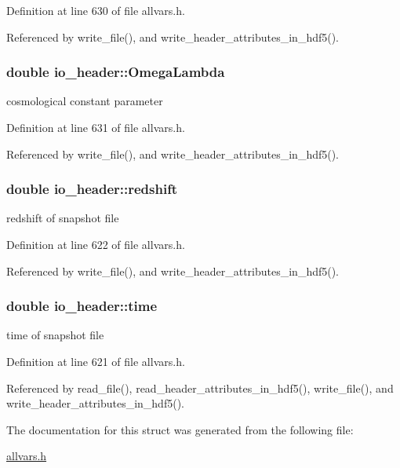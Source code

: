 Definition at line 630 of file allvars.h.



Referenced by write\_\-file(), and write\_\-header\_\-attributes\_\-in\_\-hdf5().

\hypertarget{structio__header_aa2cdc9653addc264b58134006bca1bb8}{
\subsubsection[{OmegaLambda}]{\setlength{\rightskip}{0pt plus 5cm}double {\bf io\_\-header::OmegaLambda}}}
\label{structio__header_aa2cdc9653addc264b58134006bca1bb8}
cosmological constant parameter 

Definition at line 631 of file allvars.h.



Referenced by write\_\-file(), and write\_\-header\_\-attributes\_\-in\_\-hdf5().

\hypertarget{structio__header_ae2484703f374288fb266ff268a1ffa91}{
\subsubsection[{redshift}]{\setlength{\rightskip}{0pt plus 5cm}double {\bf io\_\-header::redshift}}}
\label{structio__header_ae2484703f374288fb266ff268a1ffa91}
redshift of snapshot file 

Definition at line 622 of file allvars.h.



Referenced by write\_\-file(), and write\_\-header\_\-attributes\_\-in\_\-hdf5().

\hypertarget{structio__header_ad6237959a3590772366f18000a47a7d6}{
\subsubsection[{time}]{\setlength{\rightskip}{0pt plus 5cm}double {\bf io\_\-header::time}}}
\label{structio__header_ad6237959a3590772366f18000a47a7d6}
time of snapshot file 

Definition at line 621 of file allvars.h.



Referenced by read\_\-file(), read\_\-header\_\-attributes\_\-in\_\-hdf5(), write\_\-file(), and write\_\-header\_\-attributes\_\-in\_\-hdf5().



The documentation for this struct was generated from the following file:\begin{DoxyCompactItemize}
\item 
\hyperlink{allvars_8h}{allvars.h}\end{DoxyCompactItemize}
